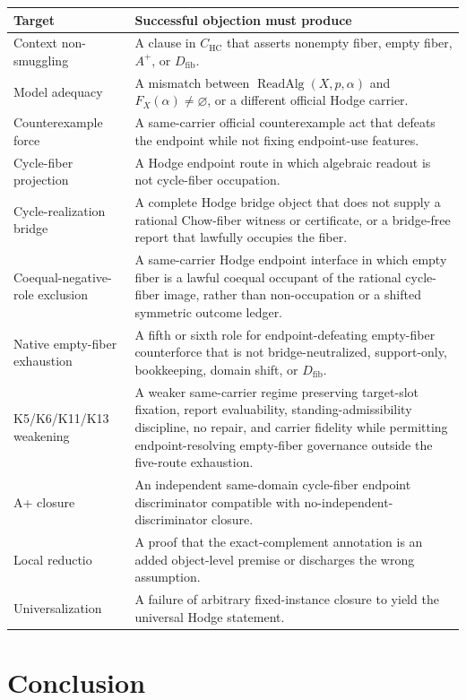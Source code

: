 \documentclass[11pt]{article}
\newcommand{\HC}{\operatorname{HC}}
\newcommand{\ReadAlg}{\operatorname{ReadAlg}}
\begin{document}
\begin{longtable}{p{}p{}}
\toprule
Target & Successful objection must produce\\
\midrule
\endhead
Context non-smuggling & A clause in $C_{\HC}$ that asserts nonempty fiber, empty fiber, $A^+$, or $D_{\mathrm{fib}}$.\\
Model adequacy & A mismatch between $\ReadAlg(X,p,\alpha)$ and $F_X(\alpha)\neq\varnothing$, or a different official Hodge carrier.\\
Counterexample force & A same-carrier official counterexample act that defeats the endpoint while not fixing endpoint-use features.\\
Cycle-fiber projection & A Hodge endpoint route in which algebraic readout is not cycle-fiber occupation.\\
Cycle-realization bridge & A complete Hodge bridge object that does not supply a rational Chow-fiber witness or certificate, or a bridge-free report that lawfully occupies the fiber.\\
Coequal-negative-role exclusion & A same-carrier Hodge endpoint interface in which empty fiber is a lawful coequal occupant of the rational cycle-fiber image, rather than non-occupation or a shifted symmetric outcome ledger.\\
Native empty-fiber exhaustion & A fifth or sixth role for endpoint-defeating empty-fiber counterforce that is not bridge-neutralized, support-only, bookkeeping, domain shift, or $D_{\mathrm{fib}}$.\\
K5/K6/K11/K13 weakening & A weaker same-carrier regime preserving target-slot fixation, report evaluability, standing-admissibility discipline, no repair, and carrier fidelity while permitting endpoint-resolving empty-fiber governance outside the five-route exhaustion.\\
A+ closure & An independent same-domain cycle-fiber endpoint discriminator compatible with no-independent-discriminator closure.\\
Local reductio & A proof that the exact-complement annotation is an added object-level premise or discharges the wrong assumption.\\
Universalization & A failure of arbitrary fixed-instance closure to yield the universal Hodge statement.\\
\bottomrule
\end{longtable}

\section{Conclusion}
\end{document}
